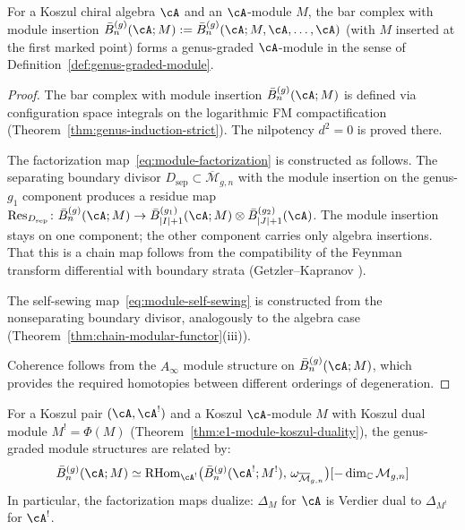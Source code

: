 \begin{theorem}\label{thm:module-genus-tower}
For a Koszul chiral algebra $\cA$ and an $\cA$-module $M$, the
bar complex with module insertion
$\bar{B}^{(g)}_n(\cA; M) :=
\bar{B}^{(g)}_n(\cA; M, \cA, \ldots, \cA)$
\textup{(}with $M$ inserted at the first marked
point\textup{)} forms a genus-graded $\cA$-module in the sense
of Definition~\textup{\ref{def:genus-graded-module}}.
\end{theorem}

\begin{proof}
The bar complex with module insertion
$\bar{B}^{(g)}_n(\cA; M)$ is defined via configuration space
integrals on the logarithmic FM compactification
(Theorem~\ref{thm:genus-induction-strict}).  The nilpotency
$d^2 = 0$ is proved there.

The factorization map~\eqref{eq:module-factorization} is
constructed as follows.  The separating boundary divisor
$D_{\mathrm{sep}} \subset \overline{\mathcal{M}}_{g,n}$ with
the module insertion on the genus-$g_1$ component produces a
residue map
$\mathrm{Res}_{D_{\mathrm{sep}}}\colon
\bar{B}^{(g)}_n(\cA; M) \to
\bar{B}^{(g_1)}_{|I|+1}(\cA; M) \otimes
\bar{B}^{(g_2)}_{|J|+1}(\cA)$.
The module insertion stays on one component; the other component
carries only algebra insertions.  That this is a chain map follows
from the compatibility of the Feynman transform differential with
boundary strata (Getzler--Kapranov \cite{GeK98}).

The self-sewing map~\eqref{eq:module-self-sewing} is constructed
from the nonseparating boundary divisor, analogously to the
algebra case (Theorem~\ref{thm:chain-modular-functor}(iii)).

Coherence follows from the $A_\infty$ module structure on
$\bar{B}^{(g)}_n(\cA; M)$, which provides the required
homotopies between different orderings of degeneration.
\end{proof}

\begin{proposition}\label{prop:genus-module-koszul}
For a Koszul pair $(\cA, \cA^!)$ and a Koszul $\cA$-module $M$
with Koszul dual module $M^! = \Phi(M)$
\textup{(}Theorem~\textup{\ref{thm:e1-module-koszul-duality})},
the genus-graded module structures are related by:
\begin{equation}\label{eq:genus-module-duality}
\bar{B}^{(g)}_n(\cA; M) \simeq
\mathrm{RHom}_{\cA^!}\bigl(\bar{B}^{(g)}_n(\cA^!; M^!),\,
\omega_{\overline{\mathcal{M}}_{g,n}}\bigr)
[-\dim_{\mathbb{C}} \mathcal{M}_{g,n}]
\end{equation}
In particular, the factorization maps dualize:
$\Delta_M$ for $\cA$ is Verdier dual to $\Delta_{M^!}$ for $\cA^!$.
\end{proposition}

